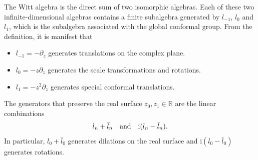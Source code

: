 \documentclass[10pt]{article}
\newcommand{\ii}{\mathrm{i}}
\begin{document}
\begin{remark}
    The Witt algebra is the direct sum of two isomorphic algebras.
    Each of these two infinite-dimensional algebras contains a finite subalgebra generated by $l_{-1}$, $l_0$ and $l_1$, which is the subalgebra associated with the global conformal group.
    From the definition, it is manifest that
    \begin{itemize}
        \item $l_{-1}=-\partial_z$ generates translations on the complex plane.
        \item $l_{0}=-z\partial_z$ generates the scale transformations and rotations.
        \item $l_{1}=-z^2\partial_z$ generates special conformal translations.
    \end{itemize}

    The generators that preserve the real surface $z_0,z_1\in\mathbb{R}$ are the linear combinations
    \begin{align}
        l_n+\bar{l}_n\qq{and}\ii(l_n-\bar{l}_n).
    \end{align}
    In particular, $l_0+\bar{l}_0$ generates dilations on the real surface and $\ii\left(l_0-\bar{l}_0\right)$ generates rotations.
\end{remark}
\end{document}
